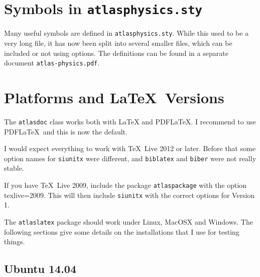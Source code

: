 \documentclass[atlasstyle,UKenglish]{latex/atlasdoc}
\newcommand{\File}[1]{\texttt{#1}\xspace}
\newcommand{\Option}[1]{\textsf{#1}\xspace}
\newcommand{\Package}[1]{\texttt{#1}\xspace}
\begin{document}
\section{Symbols in \texttt{atlasphysics.sty}}
\label{sec:atlasphysics}

Many useful symbols are defined in \texttt{atlasphysics.sty}.
While this used to be a very long file, it has now been split into several smaller files,
which can be included or not using options.
The definitions can be found in a separate document \File{atlas-physics.pdf}.


\section{Platforms and \LaTeX\ Versions}
\label{sec:version}

The \texttt{atlasdoc} class works both with \LaTeX{} and PDF\LaTeX{}.
I recommend to use PDF\LaTeX\ and this is now the default.

I would expect everything to work with \TeX\ Live 2012 or later.
Before that some option names for \texttt{siunitx} were different, and \texttt{biblatex} and \texttt{biber}
were not really stable.

If you have \TeX\ Live 2009, include the package \Package{atlaspackage} with the option
\Option{texlive=2009}. This will then include \Package{siunitx} with the correct options for
Version 1.

The \Package{atlaslatex} package should work under Linux, MacOSX and Windows.
The following sections give some details on the installations that I use for testing things.


\subsection{Ubuntu 14.04}
\end{document}
